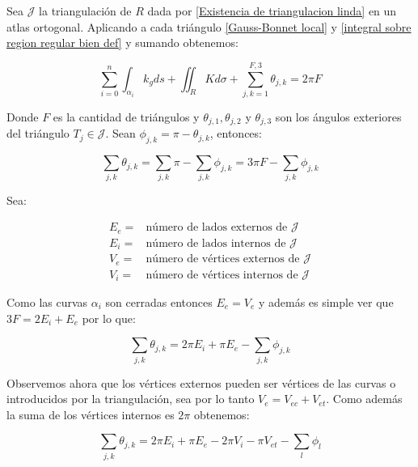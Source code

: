 \documentclass[11pt]{article}
\newenvironment{proof}[1][Demostraci\'on]{\begin{trivlist}
		\item[\hskip \labelsep {\bfseries #1}]}{\end{trivlist}}
\begin{document}
\begin{proof}
	Sea $\mathcal{J}$ la triangulaci\'on de $R$ dada por \ref{Existencia de triangulacion linda} en un atlas ortogonal. Aplicando a cada tri\'angulo \ref{Gauss-Bonnet local} y \ref{integral sobre region regular bien def} y sumando obtenemos:
	
	\begin{equation*}
		\sum\limits_{i=0}^{n}\int_{\alpha_i} k_g ds + \iint_{R} Kd\sigma + \sum\limits_{j,k=1}^{F,3}{\theta_{j,k}} = 2\pi F
	\end{equation*}
	
	Donde $F$ es la cantidad de tri\'angulos y $\theta_{j,1} , \theta_{j,2}$ y $ \theta_{j,3}$ son los \'angulos exteriores del tri\'angulo $T_j \in \mathcal{J}$. Sean $\phi_{j,k} = \pi - \theta_{j,k}$, entonces:
	
	\begin{equation*}
		\sum\limits_{j,k}{ \theta_{j,k}} = \sum\limits_{j,k}{\pi} - \sum\limits_{j,k}{\phi_{j,k}} = 3 \pi F -  \sum\limits_{j,k}{\phi_{j,k}}
	\end{equation*}
	
	Sea:
	
	\[
	\begin{aligned}
		E_e = & \text{n\'umero de lados externos de } \mathcal{J} \\
		E_i = & \text{n\'umero de lados internos de } \mathcal{J} \\
		V_e = & \text{n\'umero de v\'ertices externos de } \mathcal{J} \\
		V_i = & \text{n\'umero de v\'ertices internos de } \mathcal{J}
	\end{aligned}
	\]
	
	Como las curvas $\alpha_{i}$ son cerradas entonces $E_e = V_e$ y adem\'as es simple ver que $3F = 2E_i + E_e$ por lo que:
	
	\begin{equation*}
	\sum\limits_{j,k}{ \theta_{j,k}} =  2\pi E_i + \pi E_e -  \sum\limits_{j,k}{\phi_{j,k}}
	\end{equation*}
	
	Observemos ahora que los v\'ertices externos pueden ser v\'ertices de las curvas o introducidos por la triangulaci\'on, sea por lo tanto $V_e = V_{ec} + V_{et}$. Como adem\'as la suma de los v\'ertices internos es $2 \pi$ obtenemos:
	
	\begin{equation*}
	\sum\limits_{j,k}{ \theta_{j,k}} =  2\pi E_i + \pi E_e -  2 \pi V_i - \pi V_{et} - \sum\limits_{l}{\phi_{l}}
	\end{equation*}	
	

\end{proof}
\end{document}
